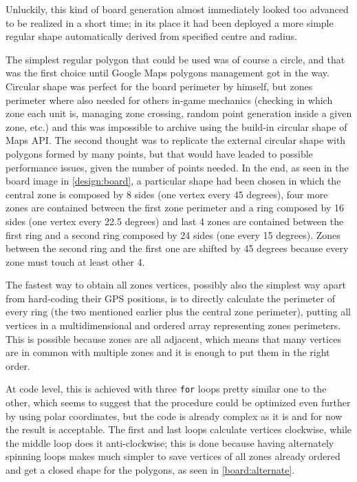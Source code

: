 			Unluckily, this kind of board generation almost immediately looked too advanced to be realized in a short time; in its place it had been deployed a more simple regular shape automatically derived from specified centre and radius.
			
			The simplest regular polygon that could be used was of course a circle, and that was the first choice until Google Maps polygons management got in the way. Circular shape was perfect for the board perimeter by himself, but zones perimeter where also needed for others in-game mechanics (checking in which zone each unit is, managing zone crossing, random point generation inside a given zone, etc.) and this was impossible to archive using the build-in circular shape of Maps API.
			The second thought was to replicate the external circular shape with polygons formed by many points, but that would have leaded to possible performance issues, given the number of points needed.
			In the end, as seen in the board image in \autoref{design:board}, a particular shape had been chosen in which the central zone is composed by 8 sides (one vertex every 45 degrees), four more zones are contained between the first zone perimeter and a ring composed by 16 sides (one vertex every 22.5 degrees) and last 4 zones are contained between the first ring and a second ring composed by 24 sides (one every 15 degrees).
			Zones between the second ring and the first one are shifted by 45 degrees because every zone must touch at least other 4.
			
			The fastest way to obtain all zones vertices, possibly also the simplest way apart from hard-coding their GPS positions, is to directly calculate the perimeter of every ring (the two mentioned earlier plus the central zone perimeter), putting all vertices in a multidimensional and ordered array representing zones perimeters.
			This is possible because zones are all adjacent, which means that many vertices are in common with multiple zones and it is enough to put them in the right order.
			
			At code level, this is achieved with three \lstinline|for| loops pretty similar one to the other, which seems to suggest that the procedure could be optimized even further by using polar coordinates, but the code is already complex as it is and for now the result is acceptable.
			The first and last loops calculate vertices clockwise, while the middle loop does it anti-clockwise; this is done because having alternately spinning loops makes much simpler to save vertices of all zones already ordered and get a closed shape for the polygons, as seen in \autoref{board:alternate}.
			
